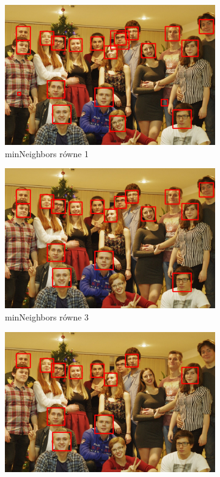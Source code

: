\begin{figure}[H]
    \centering
        \begin{subfigure}{0.32\textwidth}
        \centering
        \includegraphics[width=\linewidth]{imgs/somsiad1.jpg}
        \caption{minNeighbors równe 1}
        \label{fig:somsiadTwarze1}
    \end{subfigure}\hfill
    \begin{subfigure}{0.32\textwidth}
        \centering
        \includegraphics[width=\linewidth]{imgs/somsiad3.jpg}
        \caption{minNeighbors równe 3}
        \label{fig:somsiadTwarze3}
    \end{subfigure}\hfill
    \begin{subfigure}{0.32\textwidth}
        \centering
        \includegraphics[width=\linewidth]{imgs/somsiad8.jpg}

\end{subfigure}
\end{figure}
